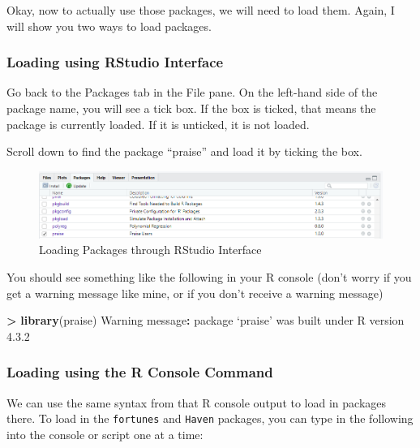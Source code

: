 \documentclass[
]{book}
\newenvironment{Shaded}{\begin{snugshade}}{\end{snugshade}}
\newcommand{\DecValTok}[1]{\textcolor[rgb]{0.00,0.00,0.81}{#1}}
\newcommand{\FloatTok}[1]{\textcolor[rgb]{0.00,0.00,0.81}{#1}}
\newcommand{\FunctionTok}[1]{\textcolor[rgb]{0.13,0.29,0.53}{\textbf{#1}}}
\newcommand{\NormalTok}[1]{#1}
\newcommand{\SpecialCharTok}[1]{\textcolor[rgb]{0.81,0.36,0.00}{\textbf{#1}}}
\begin{document}
Okay, now to actually use those packages, we will need to load them. Again, I will show you two ways to load packages.

\hypertarget{loading-using-rstudio-interface}{%
\subsubsection{Loading using RStudio Interface}\label{loading-using-rstudio-interface}}

Go back to the Packages tab in the File pane. On the left-hand side of the package name, you will see a tick box. If the box is ticked, that means the package is currently loaded. If it is unticked, it is not loaded.

Scroll down to find the package ``praise'' and load it by ticking the box.

\begin{figure}
\centering
\includegraphics{img/04-praise-loaded.png}
\caption{\label{fig:unnamed-chunk-152}Loading Packages through RStudio Interface}
\end{figure}

You should see something like the following in your R console (don't worry if you get a warning message like mine, or if you don't receive a warning message)

\begin{Shaded}
\begin{Highlighting}[]
\SpecialCharTok{\textgreater{}} \FunctionTok{library}\NormalTok{(praise)}
\NormalTok{Warning message}\SpecialCharTok{:}
\NormalTok{package ‘praise’ was built under R version }\DecValTok{4}\NormalTok{.}\FloatTok{3.2} 
\end{Highlighting}
\end{Shaded}

\hypertarget{loading-using-the-r-console-command}{%
\subsubsection{Loading using the R Console Command}\label{loading-using-the-r-console-command}}

We can use the same syntax from that R console output to load in packages there. To load in the \texttt{fortunes} and \texttt{Haven} packages, you can type in the following into the console or script one at a time:
\end{document}
